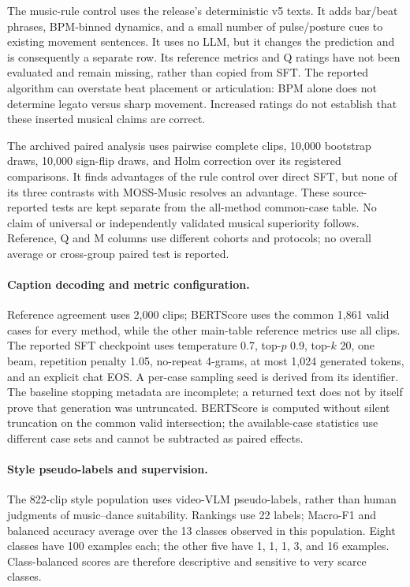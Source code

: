 The music-rule control uses the release's deterministic v5 texts. It
adds bar/beat phrases, BPM-binned dynamics, and a small number of
pulse/posture cues to existing movement sentences. It uses no LLM, but
it changes the prediction and is consequently a separate row. Its
reference metrics and Q ratings have not been evaluated and remain
missing, rather than copied from SFT. The reported algorithm can
overstate beat placement or articulation: BPM alone does not determine
legato versus sharp movement. Increased ratings do not establish
that these inserted musical claims are correct.

The archived paired analysis uses pairwise complete clips, 10,000
bootstrap draws, 10,000 sign-flip draws, and Holm correction over its
registered comparisons. It finds advantages of the rule control over
direct SFT, but none of its three contrasts with MOSS-Music resolves
an advantage. These source-reported tests are kept separate from the
all-method common-case table. No claim of universal or independently
validated musical superiority follows. Reference, Q and M columns use
different cohorts and protocols; no overall average or cross-group
paired test is reported.

\paragraph{Caption decoding and metric configuration.}
Reference agreement uses 2,000 clips; BERTScore uses the common
1,861 valid cases for every method, while the other main-table reference
metrics use all clips.
The reported SFT checkpoint uses temperature 0.7, top-$p$ 0.9,
top-$k$ 20, one beam, repetition penalty 1.05, no-repeat 4-grams,
at most 1,024 generated tokens, and an explicit chat EOS. A per-case
sampling seed is derived from its identifier. The baseline stopping
metadata are incomplete; a returned text does not by itself prove
that generation was untruncated. BERTScore is computed without silent
truncation on the common valid intersection; the available-case
statistics use different case sets and cannot be subtracted as paired
effects.

\paragraph{Style pseudo-labels and supervision.}
The 822-clip style population uses video-VLM pseudo-labels, rather than
human judgments of music--dance suitability. Rankings use 22 labels;
Macro-F1 and balanced accuracy average over the 13 classes observed in
this population. Eight classes have 100 examples each; the other five
have 1, 1, 1, 3, and 16 examples. Class-balanced scores are therefore
descriptive and sensitive to very scarce classes.

